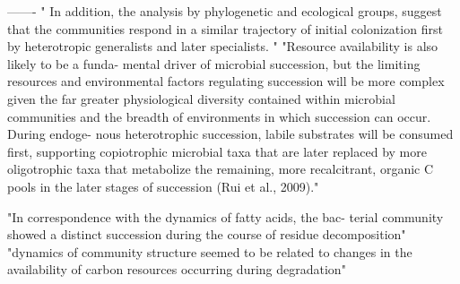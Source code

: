 -------
" In addition, the analysis by phylogenetic and ecological groups, suggest that the communities respond in a similar trajectory of initial colonization first by heterotropic generalists and later specialists. "\cite{L_pez_Lozano_2013}
"Resource availability is also likely to be a funda- mental driver of microbial succession, but the limiting resources and environmental factors regulating succession will be more complex given the far greater physiological diversity contained within microbial communities and the breadth of environments in which succession can occur. During endoge- nous heterotrophic succession, labile substrates will be consumed first, supporting copiotrophic microbial taxa that are later replaced by more oligotrophic taxa that metabolize the remaining, more recalcitrant, organic C pools in the later stages of succession (Rui et al., 2009)."\cite{Fierer_2010}

"In correspondence with the dynamics of fatty acids, the bac- terial community showed a distinct succession during the course of residue decomposition"\cite{Rui_2009}
"dynamics of community structure seemed to be related to changes in the availability of carbon resources occurring during degradation"\cite{Bastian_2009}
